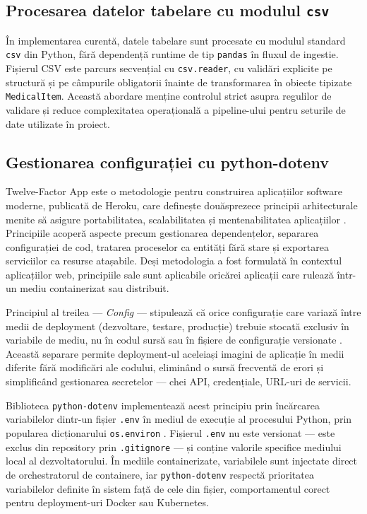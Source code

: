 \documentclass[12pt, a4paper, oneside, romanian]{teza-upb}
\begin{document}
\subsection{Procesarea datelor tabelare cu modulul \texttt{csv}}

În implementarea curentă, datele tabelare sunt procesate cu modulul standard
\texttt{csv} din Python, fără dependență runtime de tip \texttt{pandas} în fluxul
de ingestie. Fișierul CSV este parcurs secvențial cu \texttt{csv.reader}, cu
validări explicite pe structură și pe câmpurile obligatorii înainte de
transformarea în obiecte tipizate \texttt{MedicalItem}. Această abordare menține
controlul strict asupra regulilor de validare și reduce complexitatea
operațională a pipeline-ului pentru seturile de date utilizate în proiect.
\subsection{Gestionarea configurației cu python-dotenv}

Twelve-Factor App este o metodologie pentru construirea aplicațiilor software 
moderne, publicată de Heroku, care definește douăsprezece principii arhitecturale 
menite să asigure portabilitatea, scalabilitatea și mentenabilitatea aplicațiilor 
\cite{twelvefactor}. Principiile acoperă aspecte precum gestionarea dependențelor, 
separarea configurației de cod, tratarea proceselor ca entități fără stare și 
exportarea serviciilor ca resurse atașabile. Deși metodologia a fost formulată 
în contextul aplicațiilor web, principiile sale sunt aplicabile oricărei aplicații 
care rulează într-un mediu containerizat sau distribuit.

Principiul al treilea — \textit{Config} — stipulează că orice configurație care 
variază între medii de deployment (dezvoltare, testare, producție) trebuie stocată 
exclusiv în variabile de mediu, nu în codul sursă sau în fișiere de configurație 
versionate \cite{twelvefactor}. Această separare permite deployment-ul aceleiași 
imagini de aplicație în medii diferite fără modificări ale codului, eliminând 
o sursă frecventă de erori și simplificând gestionarea secretelor — chei API, 
credențiale, URL-uri de servicii.

Biblioteca \texttt{python-dotenv} implementează acest principiu prin încărcarea 
variabilelor dintr-un fișier \texttt{.env} în mediul de execuție al procesului 
Python, prin popularea dicționarului \texttt{os.environ} \cite{dotenv_doc}. 
Fișierul \texttt{.env} nu este versionat — este exclus din repository prin 
\texttt{.gitignore} — și conține valorile specifice mediului local al 
dezvoltatorului. În mediile containerizate, variabilele sunt injectate direct 
de orchestratorul de containere, iar \texttt{python-dotenv} respectă prioritatea 
variabilelor definite în sistem față de cele din fișier, comportamentul corect 
pentru deployment-uri Docker sau Kubernetes.
\end{document}
